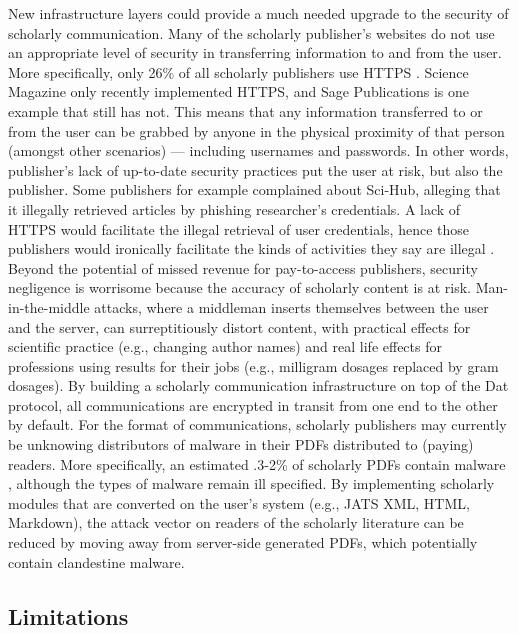 \documentclass[publications,article,submit,moreauthors,pdftex,10pt,a4paper]{Definitions/mdpi}
\begin{document}
New infrastructure layers could provide a much needed upgrade to the security of scholarly communication. Many of the scholarly publisher's websites do not use an appropriate level of security in transferring information to and from the user. More specifically, only 26\% of all scholarly publishers use HTTPS \citep{https-hartgerink}. Science Magazine only recently implemented HTTPS, and Sage Publications is one example that still has not. This means that any information transferred to or from the user can be grabbed by anyone in the physical proximity of that person (amongst other scenarios) --- including usernames and passwords. In other words, publisher's lack of up-to-date security practices put the user at risk, but also the publisher. Some publishers for example complained about Sci-Hub, alleging that it illegally retrieved articles by phishing researcher's credentials. A lack of HTTPS would facilitate the illegal retrieval of user credentials, hence those publishers would ironically facilitate the kinds of activities they say are illegal \citep{doi:10.1126/science.aaf5664}. Beyond the potential of missed revenue for pay-to-access publishers, security negligence is worrisome because the accuracy of scholarly content is at risk. Man-in-the-middle attacks, where a middleman inserts themselves between the user and the server, can surreptitiously distort content, with practical effects for scientific practice (e.g., changing author names) and real life effects for professions using results for their jobs (e.g., milligram dosages replaced by gram dosages). By building a scholarly communication infrastructure on top of the Dat protocol, all communications are encrypted in transit from one end to the other by default. For the format of communications, scholarly publishers may currently be unknowing distributors of malware in their PDFs distributed to (paying) readers. More specifically, an estimated .3-2\% of scholarly PDFs contain malware \citep{doi:10.3233/978-1-61499-744-3-107}, although the types of malware remain ill specified. By implementing scholarly modules that are converted on the user's system (e.g., JATS XML, HTML, Markdown), the attack vector on readers of the scholarly literature can be reduced by moving away from server-side generated PDFs, which potentially contain clandestine malware.

\subsection{Limitations}
\end{document}
